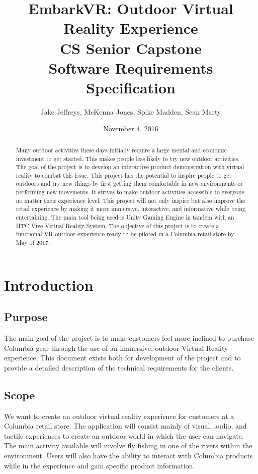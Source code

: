 \documentclass[10pt,journal,compsoc,onecolumn, draftclsnofoot]{IEEEtran}
\title{
EmbarkVR: Outdoor Virtual Reality Experience \\
CS Senior Capstone \\
Software Requirements Specification \\
\vspace{2cm}
}
\author{Jake Jeffreys, McKenna Jones, Spike Madden, Sean Marty}
\date{November 4, 2016}
\begin{document}
\begin{bibunit}

\begin{titlepage}
\vspace{3cm}
\maketitle
\vspace{3cm}
\begin{abstract}
Many outdoor activities these days initially require a large mental and economic
investment to get started. This makes people less likely to try new outdoor
activities. The goal of the project is to develop an interactive product
demonstration with virtual reality to combat this issue. This project has the
potential to inspire people to get outdoors and try new things by first getting
them comfortable in new environments or performing new movements. It strives to
make outdoor activities accessible to everyone no matter their experience level.
This project will not only inspire but also improve the retail experience by
making it more immersive, interactive, and informative while being
entertaining. The main tool being used is Unity Gaming Engine in tandem with an
HTC Vive Virtual Reality System. The objective of this project is to create a
functional VR outdoor experience ready to be piloted in a Columbia retail store
by May of 2017.
\end{abstract}

\end{titlepage}

\tableofcontents
\clearpage
\section{Introduction}

\subsection{Purpose}
The main goal of the project is to make customers feel more inclined to purchase
Columbia gear through the use of an immersive, outdoor Virtual Reality
experience. This document exists both for development of the project and to provide a detailed description of the technical requirements for the clients.

\subsection{Scope}
We want to create an outdoor virtual reality experience for customers at a
Columbia retail store. The application will consist mainly of visual, audio, and tactile
experiences to create an outdoor world in which the user can navigate. The main
activity available will involve fly fishing in one of the rivers within the
environment. Users will also have the ability to interact with Columbia products
while in the experience and gain specific product information.


\end{bibunit}
\end{document}

